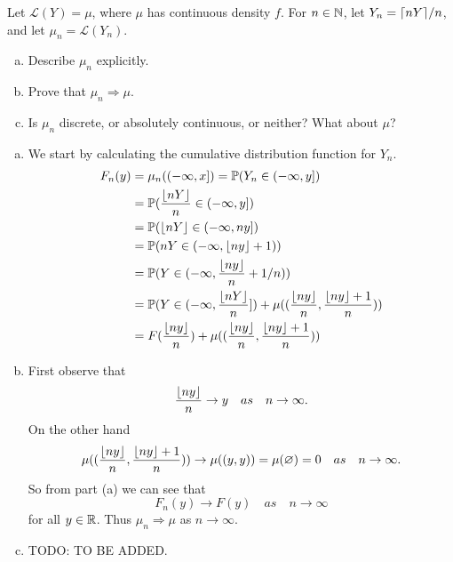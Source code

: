 \begin{problem}
	Let $ \mathcal{L}(Y) = \mu $, where $ \mu $ has continuous density $ f $. For $ n\in \mathbb{N} $, let $ Y_n = \lceil nY \rceil/n $, and let $ \mu_n = \mathcal{L}(Y_n) $.
	\begin{enumerate}[(a)]
		\item Describe $ \mu_n $ explicitly.
		\item Prove that $ \mu_n \Rightarrow \mu $.
		\item Is $ \mu_n $ discrete, or absolutely continuous, or neither? What about $ \mu $?
	\end{enumerate}
\end{problem}
\begin{solution}
	\begin{enumerate}[(a)]
		\item We start by calculating the cumulative distribution function for $ Y_n $.
		\begin{align*}
			F_n(y) &= \mu_n((-\infty,x]) = \mathbb{P}(Y_n\in(-\infty,y]) \\
			&= \mathbb{P}(\frac{\lfloor nY \rfloor}{n}\in (-\infty,y]) \\
			&= \mathbb{P}(\lfloor nY \rfloor\in (-\infty,ny]) \\
			&= \mathbb{P}(nY \in (-\infty,\lfloor ny \rfloor+1))\\
			&= \mathbb{P}(Y \in (-\infty,\frac{\lfloor ny \rfloor}{n} + 1/n))\\
			&= \mathbb{P}(Y \in (-\infty,\frac{\lfloor nY \rfloor}{n}]) + \mu((\frac{\lfloor ny \rfloor}{n},\frac{\lfloor ny \rfloor+1}{n})) \\
			&= F(\frac{\lfloor ny \rfloor}{n}) + \mu((\frac{\lfloor ny \rfloor}{n},\frac{\lfloor ny \rfloor+1}{n}))
 		\end{align*}
 		\item First observe that 
 		\[ \frac{\lfloor ny \rfloor}{n} \to y \quad as \quad n\to\infty. \]
 		On the other hand
 		\[ \mu((\frac{\lfloor ny \rfloor}{n},\frac{\lfloor ny \rfloor+1}{n})) \to \mu((y,y)) = \mu(\varnothing) = 0 \quad as \quad n\to\infty. \]
 		So from part (a) we can see that
 		\[ F_n(y) \to F(y) \quad as \quad n\to\infty \]
 		for all $ y\in \mathbb{R} $. Thus $ \mu_n \Rightarrow \mu $ as $ n\to\infty $.
 		\item {\color{red} \noindent TODO: TO BE ADDED.}
	\end{enumerate}
\end{solution}


